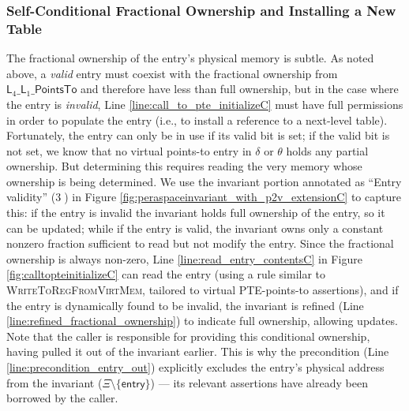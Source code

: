 \subsubsection{Self-Conditional Fractional Ownership and Installing a New Table}
The fractional ownership of the entry's physical memory is subtle.
As noted above, a \emph{valid} entry must coexist with the fractional ownership from
$\textsf{L}_{4}\_\textsf{L}_{1}\_\textsf{PointsTo}$ and therefore have less than full ownership,
but in the case where the entry is \emph{invalid}, Line \ref{line:call_to_pte_initializeC} must have full permissions in order
to populate the entry (i.e., to install a reference to a next-level table).
Fortunately, the entry can only be in use if its valid bit is set; if the valid bit is not set, we know
that no virtual points-to entry in $\delta$ or $\theta$ holds any partial ownership.
But determining this requires reading the very memory whose ownership is being determined.
We use the invariant portion annotated as ``Entry validity'' (\textcircled{3}) in Figure \ref{fig:peraspaceinvariant_with_p2v_extensionC} to capture this:
if the entry is invalid the invariant holds full ownership of the entry, so it can be updated;
while if the entry is valid, the invariant owns only a constant nonzero fraction sufficient to read but not modify the entry.
Since the fractional ownership is always non-zero, Line \ref{line:read_entry_contentsC} in Figure \ref{fig:calltopteinitializeC} can read the entry
(using a rule similar to \textsc{WriteToRegFromVirtMem}, tailored to virtual PTE-points-to assertions),
and if the entry is dynamically found to be invalid, the invariant is refined (Line \ref{line:refined_fractional_ownership})
to indicate full ownership, allowing updates.
Note that the caller is responsible for providing this conditional ownership, having pulled it out of the invariant earlier.
This is why the precondition (Line \ref{line:precondition_entry_out}) explicitly excludes the entry's physical address from the invariant ($\Xi\setminus\{\mathsf{entry}\}$) ---
its relevant assertions have already been borrowed by the caller.

